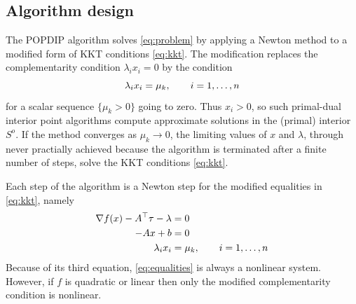 \documentclass[11pt]{article}
\newcommand{\grad}{\nabla}
\begin{document}
\subsection*{Algorithm design}

The POPDIP algorithm solves \eqref{eq:problem} by applying a Newton method to a modified form of KKT conditions \eqref{eq:kkt}.  The modification replaces the complementarity condition $\lambda_i x_i = 0$ by the condition
\begin{equation}
\lambda_i x_i = \mu_k, \qquad i=1,\dots,n \notag \\
\end{equation}
for a scalar sequence $\{\mu_k>0\}$ going to zero.  Thus $x_i>0$, so such primal-dual interior point algorithms \cite{NocedalWright2006} compute approximate solutions in the (primal) interior $S^o$.  If the method converges as $\mu_k \to 0$, the limiting values of $x$ and $\lambda$, through never practially achieved because the algorithm is terminated after a finite number of steps, solve the KKT conditions \eqref{eq:kkt}.

Each step of the algorithm is a Newton step for the modified equalities in \eqref{eq:kkt}, namely
\begin{align}
\grad f(x) - A^\top \tau - \lambda &= 0 \label{eq:equalities} \\
-A x + b &= 0 \notag \\
\lambda_i x_i &= \mu_k, \qquad i=1,\dots,n \notag
\end{align}
Because of its third equation, \eqref{eq:equalities} is always a nonlinear system.  However, if $f$ is quadratic or linear then only the modified complementarity condition is nonlinear.
\end{document}
